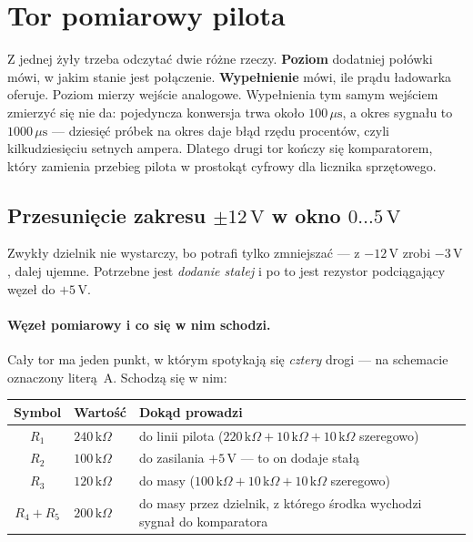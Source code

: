 \documentclass[a4paper,11pt]{article}
\newcommand{\kohm}{\,\mathrm{k}\Omega}
\newcommand{\volt}{\,\mathrm{V}}
\newcommand{\us}{\,\mu\mathrm{s}}
\begin{document}
\section{Tor pomiarowy pilota}
\label{sec:pomiar}

Z jednej żyły trzeba odczytać dwie różne rzeczy. \textbf{Poziom} dodatniej połówki
mówi, w jakim stanie jest połączenie. \textbf{Wypełnienie} mówi, ile prądu
ładowarka oferuje. Poziom mierzy wejście analogowe. Wypełnienia tym samym wejściem
zmierzyć się nie da: pojedyncza konwersja trwa około $100\us$, a okres sygnału to
$1000\us$ --- dziesięć próbek na okres daje błąd rzędu procentów, czyli
kilkudziesięciu setnych ampera. Dlatego drugi tor kończy się komparatorem, który
zamienia przebieg pilota w prostokąt cyfrowy dla licznika sprzętowego.

\subsection{Przesunięcie zakresu \texorpdfstring{$\pm12\volt$}{+/-12 V} w okno
\texorpdfstring{$0\ldots5\volt$}{0...5 V}}

Zwykły dzielnik nie wystarczy, bo potrafi tylko zmniejszać --- z $-12\volt$ zrobi
$-3\volt$, dalej ujemne. Potrzebne jest \emph{dodanie stałej} i po to jest rezystor
podciągający węzeł do $+5\volt$.

\paragraph{Węzeł pomiarowy i co się w nim schodzi.} Cały tor ma jeden punkt,
w którym spotykają się \emph{cztery} drogi --- na schemacie oznaczony literą~A.
Schodzą się w nim:

\begin{center}
\begin{tabular}{clp{7.4cm}}
\toprule
Symbol & Wartość & Dokąd prowadzi \\
\midrule
$R_1$ & $240\kohm$ & do linii pilota ($220\kohm+10\kohm+10\kohm$ szeregowo) \\
$R_2$ & $100\kohm$ & do zasilania $+5\volt$ --- to on dodaje stałą \\
$R_3$ & $120\kohm$ & do masy ($100\kohm+10\kohm+10\kohm$ szeregowo) \\
$R_4+R_5$ & $200\kohm$ & do masy przez dzielnik, z którego środka wychodzi sygnał
  do komparatora \\
\bottomrule
\end{tabular}
\end{center}
\end{document}
